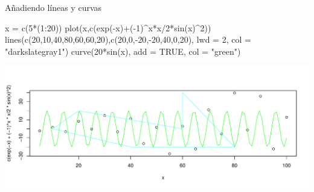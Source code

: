 \documentclass[
  ignorenonframetext,
  aspectratio=169]{beamer}
\newenvironment{Shaded}{\begin{snugshade}}{\end{snugshade}}
\newcommand{\AttributeTok}[1]{\textcolor[rgb]{0.77,0.63,0.00}{#1}}
\newcommand{\ConstantTok}[1]{\textcolor[rgb]{0.00,0.00,0.00}{#1}}
\newcommand{\DecValTok}[1]{\textcolor[rgb]{0.00,0.00,0.81}{#1}}
\newcommand{\FunctionTok}[1]{\textcolor[rgb]{0.00,0.00,0.00}{#1}}
\newcommand{\NormalTok}[1]{#1}
\newcommand{\OtherTok}[1]{\textcolor[rgb]{0.56,0.35,0.01}{#1}}
\newcommand{\SpecialCharTok}[1]{\textcolor[rgb]{0.00,0.00,0.00}{#1}}
\newcommand{\StringTok}[1]{\textcolor[rgb]{0.31,0.60,0.02}{#1}}
\begin{document}
\begin{frame}[fragile]{Añadiendo líneas y curvas}
\protect\hypertarget{auxf1adiendo-luxedneas-y-curvas}{}
\begin{Shaded}
\begin{Highlighting}[]
\NormalTok{x }\OtherTok{=} \FunctionTok{c}\NormalTok{(}\DecValTok{5}\SpecialCharTok{*}\NormalTok{(}\DecValTok{1}\SpecialCharTok{:}\DecValTok{20}\NormalTok{))}
\FunctionTok{plot}\NormalTok{(x,}\FunctionTok{c}\NormalTok{(}\FunctionTok{exp}\NormalTok{(}\SpecialCharTok{{-}}\NormalTok{x)}\SpecialCharTok{+}\NormalTok{(}\SpecialCharTok{{-}}\DecValTok{1}\NormalTok{)}\SpecialCharTok{\^{}}\NormalTok{x}\SpecialCharTok{*}\NormalTok{x}\SpecialCharTok{/}\DecValTok{2}\SpecialCharTok{*}\FunctionTok{sin}\NormalTok{(x)}\SpecialCharTok{\^{}}\DecValTok{2}\NormalTok{))}
\FunctionTok{lines}\NormalTok{(}\FunctionTok{c}\NormalTok{(}\DecValTok{20}\NormalTok{,}\DecValTok{10}\NormalTok{,}\DecValTok{40}\NormalTok{,}\DecValTok{80}\NormalTok{,}\DecValTok{60}\NormalTok{,}\DecValTok{60}\NormalTok{,}\DecValTok{20}\NormalTok{),}\FunctionTok{c}\NormalTok{(}\DecValTok{20}\NormalTok{,}\DecValTok{0}\NormalTok{,}\SpecialCharTok{{-}}\DecValTok{20}\NormalTok{,}\SpecialCharTok{{-}}\DecValTok{20}\NormalTok{,}\DecValTok{40}\NormalTok{,}\DecValTok{0}\NormalTok{,}\DecValTok{20}\NormalTok{), }
      \AttributeTok{lwd =} \DecValTok{2}\NormalTok{, }\AttributeTok{col =} \StringTok{"darkslategray1"}\NormalTok{)}
\FunctionTok{curve}\NormalTok{(}\DecValTok{20}\SpecialCharTok{*}\FunctionTok{sin}\NormalTok{(x), }\AttributeTok{add =} \ConstantTok{TRUE}\NormalTok{, }\AttributeTok{col =} \StringTok{"green"}\NormalTok{)}
\end{Highlighting}
\end{Shaded}

\begin{center}\includegraphics[width=0.8\linewidth]{Hora2_files/figure-beamer/unnamed-chunk-16-1} \end{center}
\end{frame}
\end{document}
